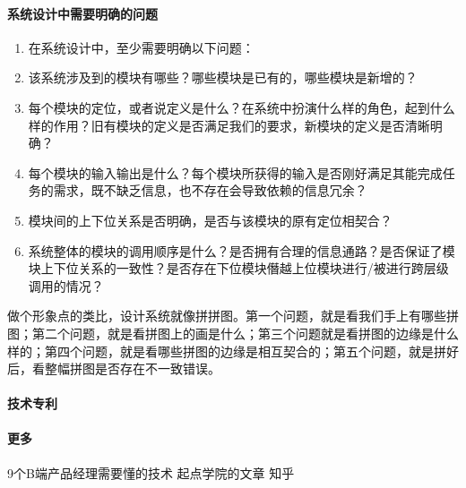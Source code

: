 \documentclass[letterpaper,10pt,english]{sphinxmanual}
\begin{document}
\paragraph{系统设计中需要明确的问题}
\label{\detokenize{chapter_idea/understand_tech:id42}}\begin{enumerate}
%
\item {} 
在系统设计中，至少需要明确以下问题：

\item {} 
该系统涉及到的模块有哪些？哪些模块是已有的，哪些模块是新增的？

\item {} 
每个模块的定位，或者说定义是什么？在系统中扮演什么样的角色，起到什么样的作用？旧有模块的定义是否满足我们的要求，新模块的定义是否清晰明确？

\item {} 
每个模块的输入输出是什么？每个模块所获得的输入是否刚好满足其能完成任务的需求，既不缺乏信息，也不存在会导致依赖的信息冗余？

\item {} 
模块间的上下位关系是否明确，是否与该模块的原有定位相契合？

\item {} 
系统整体的模块的调用顺序是什么？是否拥有合理的信息通路？是否保证了模块上下位关系的一致性？是否存在下位模块僭越上位模块进行/被进行跨层级调用的情况？

\end{enumerate}

做个形象点的类比，设计系统就像拼拼图。第一个问题，就是看我们手上有哪些拼图；第二个问题，就是看拼图上的画是什么；第三个问题就是看拼图的边缘是什么样的；第四个问题，就是看哪些拼图的边缘是相互契合的；第五个问题，就是拼好后，看整幅拼图是否存在不一致错误。
%
\begin{footnote}[449]\sphinxAtStartFootnote
{}
%
\end{footnote}


\paragraph{技术专利}
\label{\detokenize{chapter_idea/understand_tech:id43}}


\paragraph{更多}
\label{\detokenize{chapter_idea/understand_tech:id44}}
9个B端产品经理需要懂的技术 \sphinxhyphen{} 起点学院的文章 \sphinxhyphen{} 知乎
\end{document}
